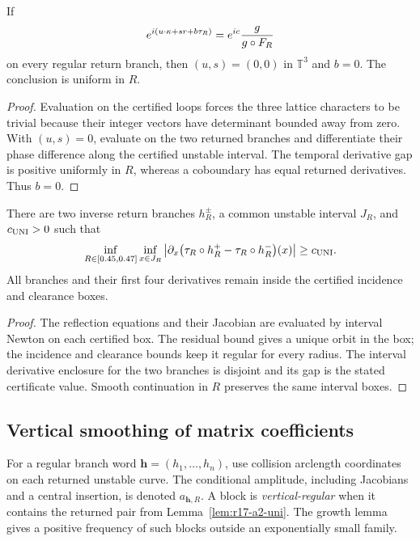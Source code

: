 \begin{lemma}
\label{lem:r17-a2-arithmetic}
If
\[
 e^{i(u\cdot\kappa+s r+b\tau_R)}
 =e^{ic}{g\over g\circ F_R}
\]
on every regular return branch, then \((u,s)=(0,0)\) in
\(\mathbb T^3\) and \(b=0\).  The conclusion is uniform in \(R\).
\end{lemma}

\begin{proof}
Evaluation on the certified loops forces the three lattice characters to be
trivial because their integer vectors have determinant bounded away from
zero.  With \((u,s)=0\), evaluate on the two returned branches and
differentiate their phase difference along the certified unstable interval.
The temporal derivative gap is positive uniformly in \(R\), whereas a
coboundary has equal returned derivatives.  Thus \(b=0\).
\end{proof}

\begin{lemma}
\label{lem:r17-a2-uni}
There are two inverse return branches \(h_R^\pm\), a common unstable interval
\(J_R\), and \(c_{\rm UNI}>0\) such that
\[
 \inf_{R\in[0.45,0.47]}
 \inf_{x\in J_R}
 \left|\partial_x\bigl(\tau_R\circ h_R^+
                    -\tau_R\circ h_R^-\bigr)(x)\right|
 \ge c_{\rm UNI}.
\]
All branches and their first four derivatives remain inside the certified
incidence and clearance boxes.
\end{lemma}

\begin{proof}
The reflection equations and their Jacobian are evaluated by interval Newton
on each certified box.  The residual bound gives a unique orbit in the box;
the incidence and clearance bounds keep it regular for every radius.  The
interval derivative enclosure for the two branches is disjoint and its gap is
the stated certificate value.  Smooth continuation in \(R\) preserves the
same interval boxes.
\end{proof}

\subsection{Vertical smoothing of matrix coefficients}

For a regular branch word \(\mathbf h=(h_1,\ldots,h_n)\), use collision
arclength coordinates on each returned unstable curve.  The conditional
amplitude, including Jacobians and a central insertion, is denoted
\(a_{\mathbf h,R}\).  A block is \emph{vertical-regular} when it contains the
returned pair from Lemma~\ref{lem:r17-a2-uni}.  The growth lemma gives a
positive frequency of such blocks outside an exponentially small family.

